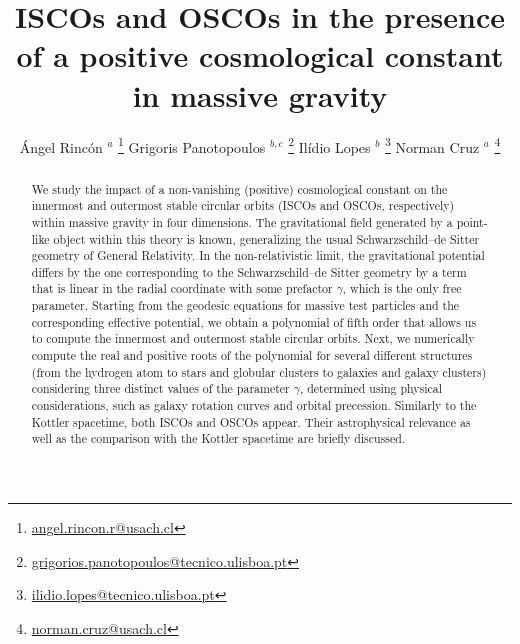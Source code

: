 \documentclass[aps,amsmath,amssymb,twocolumn]{revtex4}
\begin{document}
\title{ISCOs and OSCOs in the presence of a positive cosmological constant in massive gravity}


\author{
\'Angel Rinc\'on {${}^{a}$
\footnote{
\href{mailto:angel.rincon.r@usach.cl}{angel.rincon.r@usach.cl} 
}
} 
Grigoris Panotopoulos  {${}^{b, c}$
\footnote{
\href{mailto:grigorios.panotopoulos@tecnico.ulisboa.pt}{grigorios.panotopoulos@tecnico.ulisboa.pt} 
}
}
Il{\'i}dio Lopes  {${}^{b}$
\footnote{
\href{mailto:ilidio.lopes@tecnico.ulisboa.pt}{ilidio.lopes@tecnico.ulisboa.pt} 
}
}
Norman Cruz  {${}^{a}$
\footnote{
\href{mailto:norman.cruz@usach.cl}{norman.cruz@usach.cl} 
}
}
}


\address{
${}^a$ Departamento de F\'isica, Universidad de Santiago de Chile, Avenida Ecuador 3493, Estaci\'on Central, 9170124, Santiago, Chile.
\\
${}^b$ Centro de Astrof{\'i}sica e Gravita{\c c}{\~a}o-CENTRA, Instituto Superior T{\'e}cnico-IST, Universidade de Lisboa-UL, Av. Rovisco Pais, 1049-001 Lisboa, Portugal.  
\\
${}^c$ Departamento de Ciencias F\'isicas, Universidad de la Frontera, Avenida Francisco Salazar 01145, Temuco - Chile. 
}



\begin{abstract}
We study the impact of a non-vanishing (positive) cosmological constant on the innermost and outermost stable circular orbits (ISCOs and OSCOs, respectively) within massive gravity in four dimensions. The gravitational field generated by a point-like object within this theory is known, generalizing the usual Schwarzschild--de Sitter geometry of General Relativity. In the non-relativistic limit, the gravitational potential differs by the one corresponding to the Schwarzschild--de Sitter geometry by a term that is linear in the radial coordinate with some prefactor $\gamma$, which is the only free parameter. 
Starting from the geodesic equations for massive test particles and the corresponding effective potential, we obtain a polynomial of fifth order that allows us to compute the innermost and outermost stable circular orbits. Next, we numerically compute  the real and positive roots of the polynomial for several different structures (from the hydrogen atom to stars and globular clusters to galaxies and galaxy clusters) considering three distinct values of the parameter $\gamma$, determined using physical considerations, such as galaxy rotation curves and orbital precession. Similarly to the Kottler spacetime, both ISCOs and OSCOs appear. Their astrophysical relevance as well as the comparison with the Kottler spacetime are briefly discussed. 
\end{abstract}
\end{document}
